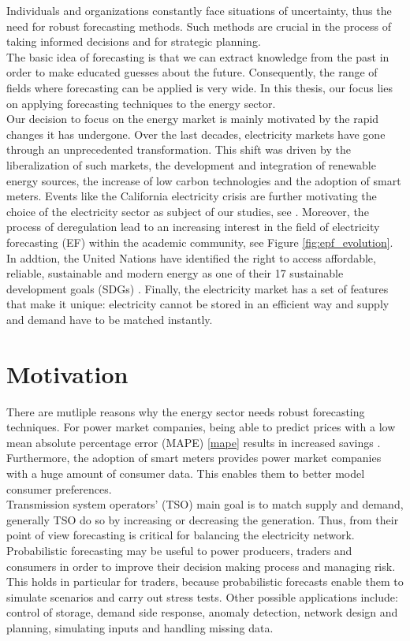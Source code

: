 Individuals and organizations constantly face situations of uncertainty, thus the need for robust forecasting methods. Such methods are crucial in the process of taking informed decisions and for strategic planning.
\\
The basic idea of forecasting is that we can extract knowledge from the past in order to make educated guesses about the future. Consequently, the range of fields where forecasting can be applied is very wide.
In this thesis, our focus lies on applying forecasting techniques to the energy sector. 
\\
Our decision to focus on the energy market is mainly motivated by the rapid changes it has undergone. %
Over the last decades, electricity markets have gone through an unprecedented transformation. This shift was driven by the liberalization of such markets, the development and integration of renewable energy sources, the  increase of low carbon technologies and the adoption of smart meters. Events like the California electricity crisis are further motivating the choice of the electricity sector as subject of our studies, see \cite{california}.
Moreover, the process of deregulation lead to an increasing interest in the field of electricity forecasting (EF) within the academic community, see Figure \ref{fig:epf_evolution}.
In addtion, the United Nations have identified the right to access affordable, reliable, sustainable and modern energy as one of their 17 sustainable development goals (SDGs) .
Finally, the electricity market has a set of features that make it unique: electricity cannot be stored in an efficient way and supply and demand have to be matched instantly.
\\
\section{Motivation}
There are mutliple reasons why the energy sector needs robust forecasting techniques.
For power market companies, being able to predict prices with a low mean absolute percentage error (MAPE) \ref{mape} results in increased savings \cite{savings}. Furthermore, the adoption of smart meters provides power market companies with a huge amount of consumer data. This enables them to better model consumer preferences.
\\
Transmission system operators' (TSO) main goal is to match supply and demand, generally TSO do so by increasing or decreasing the generation. Thus, from their point of view forecasting is critical for balancing the electricity network.
Probabilistic forecasting may be useful to power producers, traders and consumers in order to improve their decision making process and managing risk. This holds in particular for traders, because probabilistic forecasts enable them to simulate scenarios and carry out stress tests.
Other possible applications include: control of storage, demand side response, anomaly detection, network design and planning, simulating inputs and handling missing data.
\\
